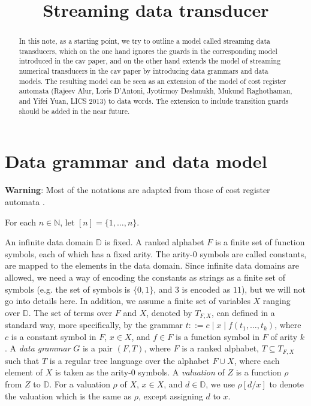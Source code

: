 \documentclass[runningheads,a4paper]{llncs}
\title{Streaming data transducer}
\author{}
\institute{}
\newcommand\dd{\mathbb{D}}
\newcommand\nat{\mathbb{N}}
\begin{document}
\maketitle


\begin{abstract}
In this note, as a starting point, we try to outline a model called streaming data transducers, which on the one hand ignores the guards in the corresponding model introduced in the cav paper, and on the other hand extends the model of streaming numerical transducers in the cav paper by introducing data grammars and data models. The resulting model can be seen as an extension of the model of cost register automata (Rajeev Alur, Loris D'Antoni, Jyotirmoy Deshmukh, Mukund Raghothaman,  and Yifei Yuan, LICS 2013) to data words. The extension to include transition guards should be added in the near future.
\end{abstract}



\section{Data grammar and data model}

{\bf Warning}: Most of the notations are adapted from those of cost register automata \cite{ADD+13}.

For each $n \in \nat$, let $[n]=\{1,\dots, n\}$.

An infinite data domain $\dd$ is fixed.
A ranked alphabet $F$ is a finite set of function symbols, each of which has a fixed arity. The arity-0 symbols are called constants, are mapped to the elements in the data domain. Since infinite data domains are allowed, we need a way of encoding the constants as strings as a finite set of symbols (e.g. the set of symbols is $\{0,1\}$, and $3$ is encoded as $11$), but we will not go into details here. In addition, we assume a  finite set of variables $X$ ranging over $\dd$.  The set of terms over $F$ and $X$, denoted by $T_{F, X}$, can defined in a standard way, more specifically, by the grammar $t::= c \mid x  \mid f(t_1,\dots, t_k)$, where $c$ is a constant symbol in $F$, $x \in X$, and $f \in F$ is a function symbol in $F$ of arity $k$. A \emph{data grammar} $G$ is a pair $(F, T)$, where $F$ is a ranked alphabet, $T \subseteq T_{F,X}$ such that $T$ is a regular tree language over the alphabet $F \cup X$, where each element of $X$ is taken as the arity-0 symbols.  A \emph{valuation} of $Z$ is a function $\rho$ from $Z$ to $\dd$. For a valuation $\rho$ of $X$, $x \in X$, and $d \in \dd$, we use $\rho[d/x]$ to denote the valuation which is the same as $\rho$, except assigning $d$ to $x$.
\end{document}
